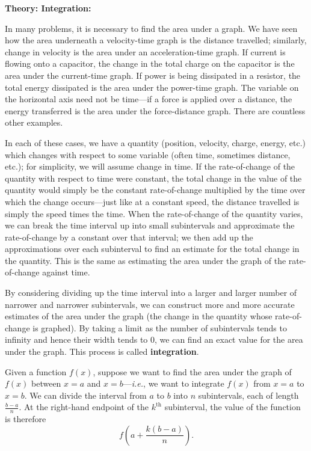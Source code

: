\documentclass{article}
\begin{document}
\clearpage













\textbf{Theory: Integration:}\bigskip



In many problems, it is necessary to find the area under a graph. We have seen how the area underneath a velocity-time graph is the distance travelled; similarly, change in velocity is the area under an acceleration-time graph. If current is flowing onto a capacitor, the change in the total charge on the capacitor is the area under the current-time graph. If power is being dissipated in a resistor, the total energy dissipated is the area under the power-time graph. The variable on the horizontal axis need not be time---if a force is applied over a distance, the energy transferred is the area under the force-distance graph. There are countless other examples.

In each of these cases, we have a quantity (position, velocity, charge, energy, etc.) which changes with respect to some variable (often time, sometimes distance, etc.); for simplicity, we will assume change in time. If the rate-of-change of the quantity with respect to time were constant, the total change in the value of the quantity would simply be the constant rate-of-change multiplied by the time over which the change occurs---just like at a constant speed, the distance travelled is simply the speed times the time. When the rate-of-change of the quantity varies, we can break the time interval up into small subintervals and approximate the rate-of-change by a constant over that interval; we then add up the approximations over each subinterval to find an estimate for the total change in the quantity. This is the same as estimating the area under the graph of the rate-of-change against time.

By considering dividing up the time interval into a larger and larger number of narrower and narrower subintervals, we can construct more and more accurate estimates of the area under the graph (the change in the quantity whose rate-of-change is graphed). By taking a limit as the number of subintervals tends to infinity and hence their width tends to 0, we can find an exact value for the area under the graph. This process is called \textbf{integration}.\bigskip

Given a function $f(x)$, suppose we want to find the area under the graph of $f(x)$ between $x=a$ and $x=b$---\textit{i.e.}, we want to integrate $f(x)$ from $x=a$ to $x=b$. We can divide the interval from $a$ to $b$ into $n$ subintervals, each of length $\frac{b-a}{n}$. At the right-hand endpoint of the $k^\mathrm{th}$ subinterval, the value of the function is therefore
\[f\left(a+\frac{k(b-a)}{n}\right).\]
\end{document}
